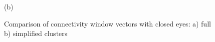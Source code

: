 \begin{figure}[h!]
\begin{minipage}[h]{0.5\linewidth}
 (b) \\
\end{minipage}
\caption{Comparison of connectivity window vectors with closed eyes: a) full b) simplified clusters} 
\end{figure}

